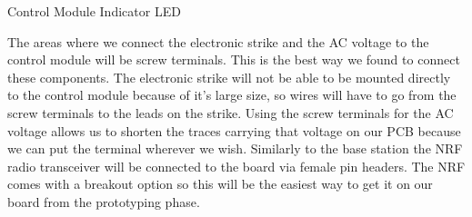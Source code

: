 {Control Module Indicator LED}

The areas where we connect the electronic strike and the AC
voltage to the control module will be screw terminals. This is the best way
we found to connect these components. The electronic strike will not be able
to be mounted directly to the control module because of it{}'s large size, so
wires will have to go from the screw terminals to the leads on the strike.
Using the screw terminals for the AC voltage allows us to shorten the traces
carrying that voltage on our PCB because we can put the terminal wherever we
wish. Similarly to the base station the NRF radio transceiver will be
connected to the board via female pin headers. The NRF comes with a breakout
option so this will be the easiest way to get it on our board from the
prototyping phase.
